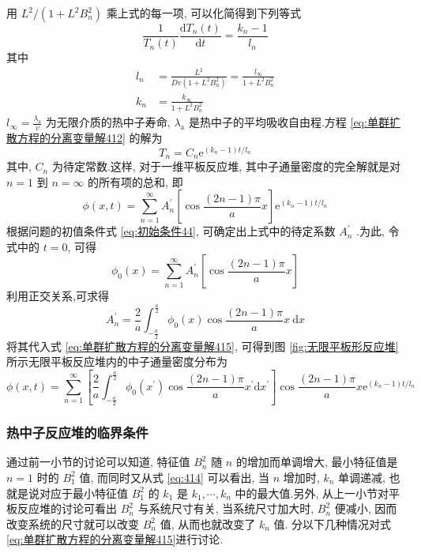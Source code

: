 \documentclass{Sichuan Normal University}
\begin{document}
用 $L^2 /\left(1+L^2 B_n^2\right)$ 乘上式的每一项, 可以化简得到下列等式
\begin{equation}
\frac{1}{T_n(t)} \frac{\mathrm{d} T_n(t)}{\mathrm{d} t}=\frac{k_n-1}{l_n}
\label{eq:单群扩散方程的分离变量解412}
\end{equation}
其中
\begin{align}
l_n&=\frac{L^2}{Dv\left(1+L^2 B_n^2\right)}=\frac{l_{\infty}}{1+L^2 B_n^2} \label{eq:413}\\
k_n&=\frac{k_{\infty}}{1+L^2 B_n^2}\label{eq:414}
\end{align}
$l_{\infty}=\frac{\lambda_{\mathrm{a}}}{v}$ 为无限介质的热中子寿命, $\lambda_{\mathrm{a}}$ 是热中子的平均吸收自由程.方程 \eqref{eq:单群扩散方程的分离变量解412} 的解为
\begin{equation}
T_n=C_n \mathrm{e}^{\left(k_n-1\right) t / l_n}
\end{equation}
其中, $C_n$ 为待定常数.这样, 对于一维平板反应堆, 其中子通量密度的完全解就是对 $n=1$ 到 $n=\infty$ 的所有项的总和, 即
\begin{equation}
\phi(x, t)=\sum_{n=1}^{\infty} A_n^{\prime}\left[\cos \frac{(2 n-1) \pi}{a} x\right] \mathrm{e}^{\left(k_n-1\right) t / l_n}
\label{eq:单群扩散方程的分离变量解415}
\end{equation}
根据问题的初值条件式 \eqref{eq:初始条件44}, 可确定出上式中的待定系数 $A_n^{\prime}$ .为此, 令式中的 $t=0$, 可得
\begin{equation}
\phi_0(x)=\sum_{n=1}^{\infty} A_n^{\prime}\left[\cos \frac{(2 n-1) \pi}{a} x\right]
\end{equation}
利用正交关系,可求得
\begin{equation}
A_n^{\prime}=\frac{2}{a} \int_{-\frac{a}{2}}^{\frac{a}{2}} \phi_0(x) \cos \frac{(2 n-1) \pi}{a} x \mathrm{~d} x
\end{equation}
将其代入式 \eqref{eq:单群扩散方程的分离变量解415}, 可得到图 \ref{fig:无限平板形反应堆} 所示无限平板反应堆内的中子通量密度分布为
\begin{equation}
\phi(x, t)=\sum_{n=1}^{\infty}\left[\frac{2}{a} \int_{-\frac{a}{2}}^{\frac{a}{2}} \phi_0\left(x^{\prime}\right) \cos \frac{(2 n-1) \pi}{a} x^{\prime} \mathrm{d} x^{\prime}\right] \cos \frac{(2 n-1) \pi}{a} x \mathrm{e}^{\left(k_n-1\right) t / l_n}
\end{equation}
\subsubsection{热中子反应堆的临界条件}

通过前一小节的讨论可以知道, 特征值 $B_n^2$ 随 $n$ 的增加而单调增大, 最小特征值是 $n=1$ 时的 $B_1^2$ 值, 而同时又从式 \eqref{eq:414} 可以看出, 当 $n$ 增加时, $k_n$ 单调递减, 也就是说对应于最小特征值 $B_1^2$ 的 $k_1$ 是 $k_1, \cdots, k_n$ 中的最大值.另外, 从上一小节对平板反应堆的讨论可看出 $B_n^2$ 与系统尺寸有关, 当系统尺寸加大时, $B_n^2$ 便减小, 因而改变系统的尺寸就可以改变 $B_n^2$ 值, 从而也就改变了 $k_n$ 值.
分以下几种情况对式 \eqref{eq:单群扩散方程的分离变量解415}进行讨论.
\end{document}
